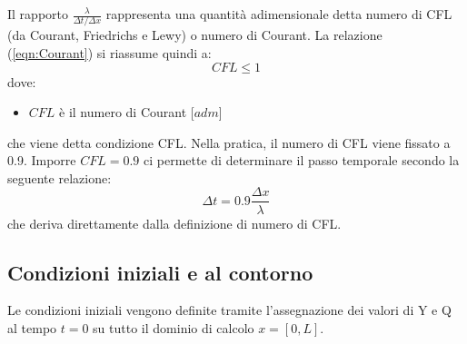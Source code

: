 \documentclass[12pt]{article} %
\begin{document}
\noindent Il rapporto $\frac{\lambda}{\Delta t/\Delta x}$ rappresenta una quantità adimensionale detta numero di CFL (da Courant, Friedrichs e Lewy) o numero di Courant. La relazione (\ref{eqn:Courant}) si riassume quindi a: 
\begin{equation}
    CFL\leq1
\end{equation}
\noindent dove:
\begin{itemize}
\item $CFL$ è il numero di Courant [$adm$]
\end{itemize}
\noindent  che viene detta condizione CFL. Nella pratica, il numero di CFL viene fissato a 0.9.
Imporre $CFL=0.9$ ci permette di determinare il passo temporale secondo la seguente relazione:
\begin{equation}
    \Delta t=0.9\frac{\Delta x}{\lambda}
\end{equation}
\noindent che deriva direttamente dalla definizione di numero  di CFL.

\subsection{Condizioni iniziali e al contorno}

\noindent Le condizioni iniziali vengono definite tramite l'assegnazione dei valori di Y e Q al tempo $t=0$ su tutto il dominio di calcolo $x=[0,L]$.
\end{document}
